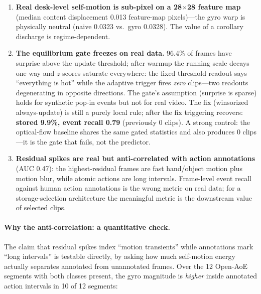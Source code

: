 \documentclass[12pt,a4paper]{article}
\begin{document}
\begin{enumerate}
  \item \textbf{Real desk-level self-motion is sub-pixel on a 28$\times$28 feature map} (median content displacement 0.013 feature-map pixels)---the gyro warp is physically neutral (naive 0.0323 vs.\ gyro 0.0328). The value of a corollary discharge is regime-dependent.
  \item \textbf{The equilibrium gate freezes on real data.} 96.4\% of frames have surprise above the update threshold; after warmup the running scale decays one-way and $z$-scores saturate everywhere: the fixed-threshold readout says ``everything is hot'' while the adaptive trigger fires \emph{zero} clips---two readouts degenerating in opposite directions. The gate's assumption (surprise is sparse) holds for synthetic pop-in events but not for real video. The fix (winsorized always-update) is still a purely local rule; after the fix triggering recovers: \textbf{stored 9.9\%, event recall 0.79} (previously 0 clips). A strong control: the optical-flow baseline shares the same gated statistics and also produces 0 clips---it is the gate that fails, not the predictor.
  \item \textbf{Residual spikes are real but anti-correlated with action annotations} (AUC 0.47): the highest-residual frames are fast hand/object motion plus motion blur, while atomic actions are long intervals. Frame-level event recall against human action annotations is the wrong metric on real data; for a storage-selection architecture the meaningful metric is the downstream value of selected clips.
\end{enumerate}

\paragraph{Why the anti-correlation: a quantitative check.} The claim that residual spikes index ``motion transients'' while annotations mark ``long intervals'' is testable directly, by asking how much self-motion energy actually separates annotated from unannotated frames. Over the 12 Open-AoE segments with both classes present, the gyro magnitude is \emph{higher} inside annotated action intervals in 10 of 12 segments:
\end{document}
